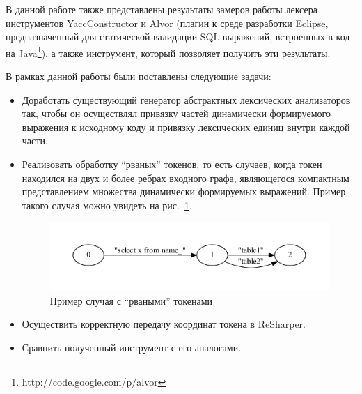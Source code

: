 В данной работе также представлены результаты замеров работы лексера инструментов YaccConstructor и Alvor (плагин к среде разработки Eclipse,
предназначенный для статической валидации SQL-выражений, встроенных в код на Java\footnote{http://code.google.com/p/alvor}), а также инструмент, который позволяет получить 
эти результаты.


В рамках данной работы были поставлены следующие задачи:
\begin{itemize}
\item Доработать существующий генератор абстрактных лексических анализаторов так, чтобы он осуществлял привязку частей динамически 
формируемого выражения к исходному коду и привязку лексических единиц внутри каждой части.
\item Реализовать обработку ``рваных'' токенов, то есть случаев, когда токен находился на двух и более ребрах входного графа, являющегося 
компактным представлением множества динамически формируемых выражений. Пример такого случая можно увидеть на рис.~\ref{fig:example_break}.

\begin{figure}[t]
\centering
\includegraphics[width=\textwidth]{Polubelova/example_break}
\caption{Пример случая с ``рваными'' токенами}
\label{fig:example_break} 
\end{figure}

\item Осуществить корректную передачу координат токена в ReSharper.
\item Сравнить полученный инструмент с его аналогами.
\end{itemize}

